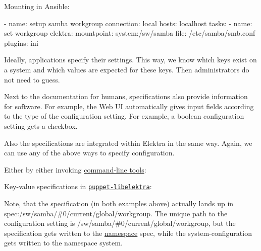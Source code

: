 Mounting in Ansible\+:


\begin{DoxyCode}
- name: setup samba workgroup
  connection: local
  hosts: localhost
  tasks:
    - name: set workgroup
    elektra:
      mountpoint: system:/sw/samba
      file: /etc/samba/smb.conf
      plugins: ini
\end{DoxyCode}


Ideally, applications specify their settings. This way, we know which keys exist on a system and which values are expected for these keys. Then administrators do not need to guess.

Next to the documentation for humans, specifications also provide information for software. For example, the Web UI automatically gives input fields according to the type of the configuration setting. For example, a boolean configuration setting gets a checkbox.

Also the specifications are integrated within Elektra in the same way. Again, we can use any of the above ways to specify configuration.

Either by either invoking \hyperlink{doc_help_kdb_md}{command-\/line tools}\+:




Key-\/value specifications in \href{https://puppet.libelektra.org}{\tt puppet-\/libelektra}\+:




Note, that the specification (in both examples above) actually lands up in {\ttfamily spec\+:/sw/samba/\#0/current/global/workgroup}. The unique path to the configuration setting is {\ttfamily /sw/samba/\#0/current/global/workgroup}, but the specification gets written to the \hyperlink{doc_tutorials_namespaces_md}{namespace} {\ttfamily spec}, while the system-\/configuration gets written to the namespace {\ttfamily system}.

